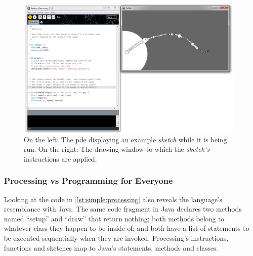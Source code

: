 \documentclass{./llncs2e/llncs}
\begin{document}
\begin{figure}
  \centering
  \includegraphics[width=1.0\textwidth]{img/proc_dev_env}
    \caption{On the left: The \ac{pde} displaying an example \emph{sketch} while it is being run. On the right: The drawing window to which the \emph{sketch's} instructions are applied.}
  \label{fig:proc:dev:env}
\end{figure} 

\subsubsection{Processing vs Programming for Everyone}
Looking at the code in \ref{lst:simple:processing} also reveals the language's resemblance with Java. The same code fragment in Java declares two methods named ``setup'' and ``draw'' that return nothing; both methods belong to whatever class they happen to be inside of; and both have a list of statements to be executed sequentially when they are invoked. Processing's instructions, functions and sketches map to Java's statements, methods and classes.

\end{document}
